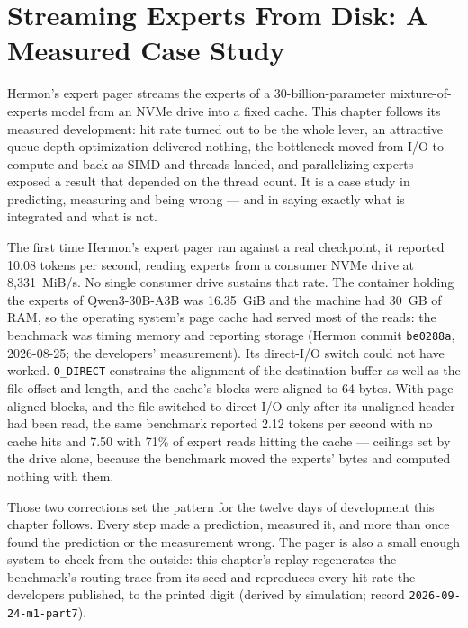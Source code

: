 \chapter{Streaming Experts From Disk: A Measured Case Study}\label{ch:expert-streaming}

\begin{ChapterIntent}
Hermon's expert pager streams the experts of a 30-billion-parameter
mixture-of-experts model from an NVMe drive into a fixed cache. This chapter
follows its measured development: hit rate turned out to be the whole lever, an
attractive queue-depth optimization delivered nothing, the bottleneck moved
from I/O to compute and back as SIMD and threads landed, and parallelizing
experts exposed a result that depended on the thread count. It is a case study
in predicting, measuring and being wrong --- and in saying exactly what is
integrated and what is not.
\end{ChapterIntent}


The first time Hermon's expert pager ran against a real checkpoint, it
reported 10.08 tokens per second, reading experts from a consumer NVMe drive at
8,331~MiB/s. No single consumer drive sustains that rate. The container holding
the experts of Qwen3-30B-A3B was 16.35~GiB and the machine had 30~GB of RAM, so
the operating system's page cache had served most of the reads: the benchmark
was timing memory and reporting storage (Hermon commit \texttt{be0288a},
2026-08-25; the developers' measurement). Its direct-I/O switch could not have
worked. \texttt{O\_DIRECT} constrains the alignment of the destination buffer as
well as the file offset and length, and the cache's blocks were aligned to 64
bytes. With page-aligned blocks, and the file switched to direct I/O only after
its unaligned header had been read, the same benchmark reported 2.12 tokens per
second with no cache hits and 7.50 with 71\% of expert reads hitting the cache
--- ceilings set by the drive alone, because the benchmark moved the experts'
bytes and computed nothing with them.

Those two corrections set the pattern for the twelve days of development this
chapter follows. Every step made a prediction, measured it, and more than once
found the prediction or the measurement wrong. The pager is also a small
enough system to check from the outside: this chapter's replay regenerates the
benchmark's routing trace from its seed and reproduces every hit rate the
developers published, to the printed digit (derived by simulation; record
\texttt{2026-09-24-m1-part7}).

